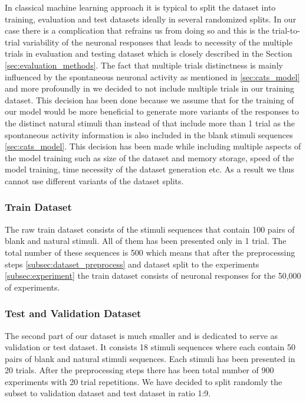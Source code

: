 In classical machine learning approach it is typical to split the dataset into training, evaluation and test datasets ideally in several randomized splits. In our case there is a complication that refrains us from doing so and this is the trial-to-trial variability of the neuronal responses that leads to necessity of the multiple trials in evaluation and testing dataset which is closely described in the Section \ref{sec:evaluation_methods}. The fact that multiple trials distinctness is mainly influenced by the spontaneous neuronal activity as mentioned in \ref{sec:cats_model} and more profoundly in \citet{antolik2024comprehensive} we decided to not include multiple trials in our training dataset. This decision has been done because we assume that for the training of our model would be more beneficial to generate more variants of the responses to the distinct natural stimuli than instead of that include more than 1 trial as the spontaneous activity information is also included in the blank stimuli sequences \ref{sec:cats_model}. This decision has been made while including multiple aspects of the model training such as size of the dataset and memory storage, speed of the model training, time necessity of the dataset generation etc. As a result we thus cannot use different variants of the dataset splits.

\subsubsection{Train Dataset}
\label{subsubsec:train_dataset}

The raw train dataset consists of the stimuli sequences that contain 100 pairs of blank and natural stimuli. All of them has been presented only in 1 trial. The total number of these sequences is 500 which means that after the preprocessing steps \ref{subsec:dataset_preprocess} and dataset split to the experiments \ref{subsec:experiment} the train dataset consists of neuronal responses for the 50,000 of experiments.

\subsubsection{Test and Validation Dataset}
\label{subsubsec:test_dataset}

The second part of our dataset is much smaller and is dedicated to serve as validation or test dataset. It consists 18 stimuli sequences where each contain 50 pairs of blank and natural stimuli sequences. Each stimuli has been presented in 20 trials. After the preprocessing steps there has been total number of 900 experiments with 20 trial repetitions. We have decided to split randomly the subset to validation dataset and test dataset in ratio 1:9.

